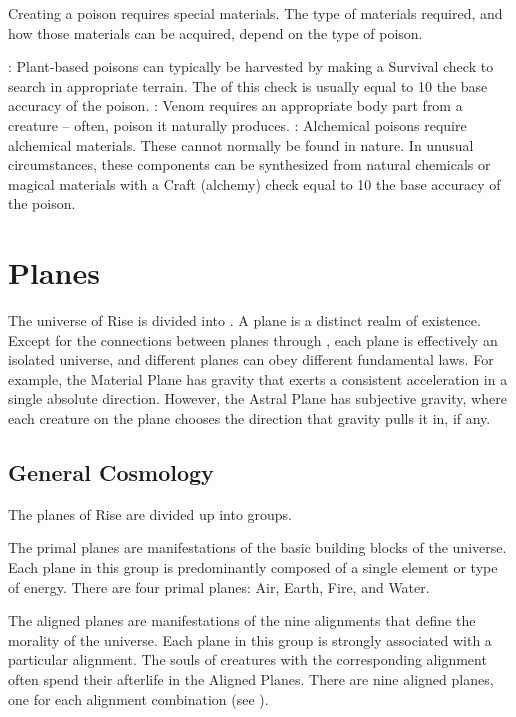         Creating a poison requires special materials.
        The type of materials required, and how those materials can be acquired, depend on the type of poison.

        \begin{itemize}
            : Plant-based poisons can typically be harvested by making a Survival check to search in appropriate terrain.
                The  of this check is usually equal to 10 \add the base accuracy of the poison.
            : Venom requires an appropriate body part from a creature -- often, poison it naturally produces.
            : Alchemical poisons require alchemical materials.
                These cannot normally be found in nature.
                In unusual circumstances, these components can be synthesized from natural chemicals or magical materials with a Craft (alchemy) check equal to 10 \add the base accuracy of the poison.
        \end{itemize}

\section{Planes}\label{Planes}
    The universe of Rise is divided into .
    A plane is a distinct realm of existence.
    Except for the connections between planes through , each plane is effectively an isolated universe, and different planes can obey different fundamental laws.
    For example, the Material Plane has gravity that exerts a consistent acceleration in a single absolute direction.
    However, the Astral Plane has subjective gravity, where each creature on the plane chooses the direction that gravity pulls it in, if any.

    \subsection{General Cosmology}
        The planes of Rise are divided up into groups.

         The primal planes are manifestations of the basic building blocks of the universe.
        Each plane in this group is predominantly composed of a single element or type of energy.
        There are four primal planes: Air, Earth, Fire, and Water.

         The aligned planes are manifestations of the nine alignments that define the morality of the universe.
        Each plane in this group is strongly associated with a particular alignment.
        The souls of creatures with the corresponding alignment often spend their afterlife in the Aligned Planes.
        There are nine aligned planes, one for each alignment combination (see ).

